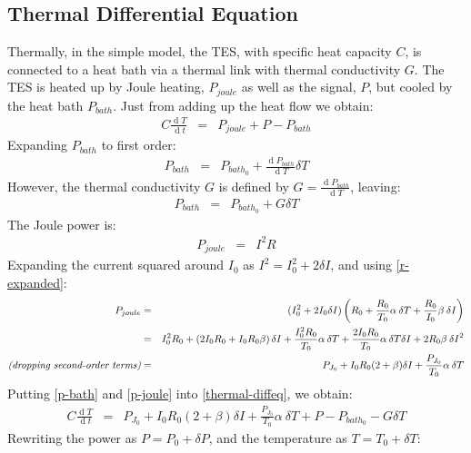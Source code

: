 \documentclass[letterpaper,10pt]{article}
\begin{document}
\subsection{Thermal Differential Equation}
Thermally, in the simple model, the TES, with specific heat capacity $C$, is connected to a heat bath via a thermal link with thermal conductivity $G$. The TES is heated up by Joule heating, $P_{joule}$ as well as the signal, $P$, but cooled by the heat bath $P_{bath}$. Just from adding up the heat flow we obtain:
\begin{eqnarray}
	C \frac{\operatorname{d}T}{\operatorname{d}t} &=& P_{joule} + P - P_{bath} \label{thermal-diffeq}
\end{eqnarray}
Expanding $P_{bath}$ to first order:
\begin{eqnarray}
	P_{bath} &=& P_{bath_0} + \frac{\operatorname{d} P_{bath}}{\operatorname{d} T} \delta T
\end{eqnarray}
However, the thermal conductivity $G$ is defined by $G = \frac{\operatorname{d} P_{bath}}{\operatorname{d} T}$, leaving:
\begin{eqnarray}
	P_{bath} &=& P_{bath_0} + G\delta T \label{p-bath}
\end{eqnarray}
The Joule power is:
\begin{eqnarray}
	P_{joule} &=& I^2 R
\end{eqnarray}
Expanding the current squared around $I_0$ as $I^2 = I_0^2 + 2 \delta I$, and using \eqref{r-expanded}:
\begin{eqnarray}
	P_{joule} &=& (I_0^2 + 2 I_0 \delta I)\left(R_0 + \frac{R_0}{T_0}\alpha \: \delta T + \frac{R_0}{I_0}\beta \: \delta I\right) \\
	&=& I_0^2 R_0 + \left(2 I_0 R_0 + I_0 R_0\beta\right) \delta I + \frac{I_0^2 R_0}{T_0}\alpha \: \delta T + \frac{2 I_0 R_0}{T_0}\alpha \: \delta T \delta I + 2R_0 \beta \: {\delta I}^2 \\
	\mbox{\em{(dropping second-order terms)}} &=& P_{J_0} + I_0 R_0 (2 + \beta) \delta I + \frac{P_{J_0}}{T_0}\alpha \: \delta T \label{p-joule}
\end{eqnarray}
Putting \eqref{p-bath} and \eqref{p-joule} into \eqref{thermal-diffeq}, we obtain:
\begin{eqnarray}
	C \frac{\operatorname{d}T}{\operatorname{d}t} &=& P_{J_0} + I_0 R_0 (2 + \beta) \delta I + \frac{P_{J_0}}{T_0}\alpha \: \delta T + P - P_{bath_0} - G\delta T
\end{eqnarray}
Rewriting the power as $P = P_0 + \delta P$, and the temperature as $T = T_0 + \delta T$:
\end{document}
